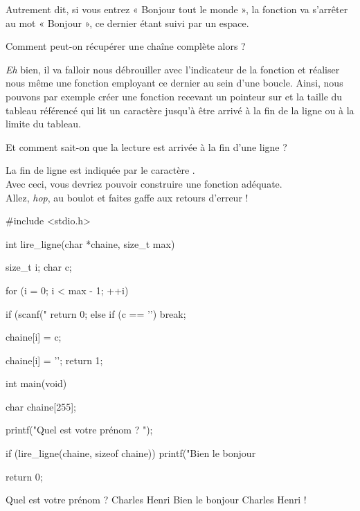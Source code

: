 Autrement dit, si vous entrez « Bonjour tout le monde », la fonction
 va s'arrêter au mot « Bonjour », ce dernier étant suivi
par un espace.

\begin{questionbox}
Comment peut-on récupérer une chaîne complète alors ?
\end{questionbox}


\emph{Eh} bien, il va falloir nous débrouiller avec l'indicateur
 de la fonction  et réaliser nous même une
fonction employant ce dernier au sein d'une boucle. Ainsi, nous pouvons
par exemple créer une fonction recevant un pointeur sur  et
la taille du tableau référencé qui lit un caractère jusqu'à être arrivé
à la fin de la ligne ou à la limite du tableau.

\begin{questionbox}
Et comment sait-on que la lecture est arrivée à la fin d'une ligne ?
\end{questionbox}


La fin de ligne est indiquée par le caractère
.\\
Avec ceci, vous devriez pouvoir construire une fonction adéquate.\\
Allez, \emph{hop}, au boulot et faites gaffe aux retours d'erreur !


\begin{C}
#include <stdio.h>


int lire_ligne(char *chaine, size_t max)
{
    size_t i;
    char c;

    for (i = 0; i < max - 1; ++i)
    {
        if (scanf("%
            return 0;
        else if (c == '\n')
            break;

        chaine[i] = c;
    }

    chaine[i] = '\0';
    return 1;
}


int main(void)
{
    char chaine[255];

    printf("Quel est votre prénom ? ");

    if (lire_ligne(chaine, sizeof chaine))
        printf("Bien le bonjour %

    return 0;
}

\end{C}

\begin{C}
 Quel est votre prénom ? Charles Henri
Bien le bonjour Charles Henri !
\end{C}

